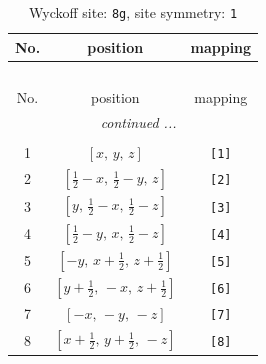 \documentclass[fleqn,8pt]{jsarticle}
\begin{document}
\renewcommand{\arraystretch}{1.2}
\begin{longtable}{ccc}
\caption{Wyckoff site: {\tt 8g}, site symmetry: {\tt 1}}
 \\
 \hline \hline
No. & position & mapping \\ \hline \endfirsthead

\multicolumn{2}{l}{\tablename\ \thetable{}} \\
 \hline \hline
No. & position & mapping \\ \hline \endhead

 \hline \hline
\multicolumn{2}{r}{\footnotesize\it continued ...} \\ \endfoot

 \hline \hline
\multicolumn{2}{r}{} \\ \endlastfoot

1 & $\left[ x,\, y,\, z \right]$ & {\tt [1]} \\ \hline
2 & $\left[ \frac{1}{2} - x,\, \frac{1}{2} - y,\, z \right]$ & {\tt [2]} \\ \hline
3 & $\left[ y,\, \frac{1}{2} - x,\, \frac{1}{2} - z \right]$ & {\tt [3]} \\ \hline
4 & $\left[ \frac{1}{2} - y,\, x,\, \frac{1}{2} - z \right]$ & {\tt [4]} \\ \hline
5 & $\left[ - y,\, x + \frac{1}{2},\, z + \frac{1}{2} \right]$ & {\tt [5]} \\ \hline
6 & $\left[ y + \frac{1}{2},\, - x,\, z + \frac{1}{2} \right]$ & {\tt [6]} \\ \hline
7 & $\left[ - x,\, - y,\, - z \right]$ & {\tt [7]} \\ \hline
8 & $\left[ x + \frac{1}{2},\, y + \frac{1}{2},\, - z \right]$ & {\tt [8]} \\
\end{longtable}
\end{document}
